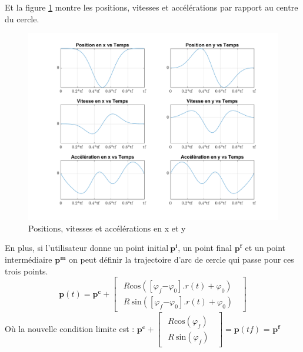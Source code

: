 \documentclass{article} %
\begin{document}
Et la figure \ref{eller5} montre les positions, vitesses et acc\'{e}l\'{e}rations par rapport au centre du cercle.  

\begin{figure}[h!]
	\includegraphics[width=\textwidth]{TrajFig5.png}
	\caption{Positions, vitesses et acc\'{e}l\'{e}rations en x et y}
	\label{eller5}
\end{figure}


En plus, si l'utilisateur donne un point initial${\boldsymbol{\ }\boldsymbol{p}}^{\boldsymbol{i}}$, un point final ${\boldsymbol{p}}^{\boldsymbol{f}}$ et un point interm\'{e}diaire ${\boldsymbol{p}}^{\boldsymbol{m}}$ on peut d\'{e}finir la trajectoire d'arc de cercle qui passe pour ces trois points.  
\[\boldsymbol{p}\left(t\right)={\boldsymbol{p}}^{\boldsymbol{c}}+\left[ \begin{array}{c}
 \begin{array}{c}
R{\mathrm{cos} (\left[{\varphi }_f{-\varphi }_0\right].r\left(t\right)+{\varphi }_0)\ } \\ 
R\ {\mathrm{sin} (\left[{\varphi }_f{-\varphi }_0\right].r\left(t\right)+{\varphi }_0)\ } \end{array}
 \end{array}
\right]\] 
O\`{u} la nouvelle condition limite est :  ${\boldsymbol{p}}^{\boldsymbol{c}}+\left[ \begin{array}{c}
 \begin{array}{c}
R{\mathrm{cos} ({\varphi }_f)\ } \\ 
R\ {\mathrm{sin} ({\varphi }_f)\ } \end{array}
 \end{array}
\right]=\boldsymbol{p}\left(tf\right)$ = ${\boldsymbol{p}}^{\boldsymbol{f}}$\textbf{}
\end{document}
